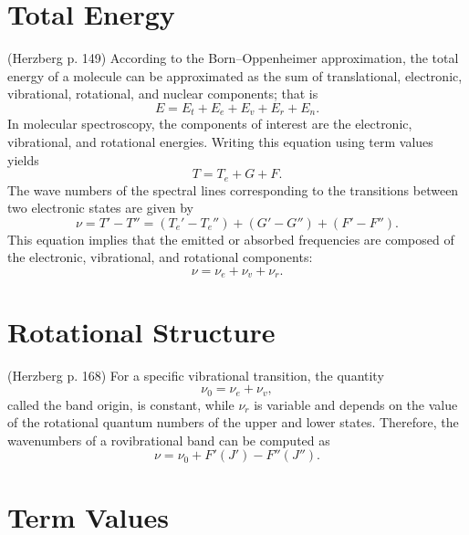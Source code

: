 \documentclass[11pt, twoside, fleqn]{report}
\begin{document}
\section{Total Energy}

 (Herzberg p. 149)
According to the Born--Oppenheimer approximation, the total energy of a molecule can be approximated as the sum of translational, electronic, vibrational, rotational, and nuclear components; that is
\begin{equation*}
    E = E_{t} + E_{e} + E_{v} + E_{r} + E_{n}.
\end{equation*}
In molecular spectroscopy, the components of interest are the electronic, vibrational, and rotational energies. Writing this equation using term values yields
\begin{equation*}
    T = T_{e} + G + F.
\end{equation*}
The wave numbers of the spectral lines corresponding to the transitions between two electronic states are given by
\begin{equation*}
    \nu = T' - T'' = (T_{e}' - T_{e}'') + (G' - G'') + (F' - F'').
\end{equation*}
This equation implies that the emitted or absorbed frequencies are composed of the electronic, vibrational, and rotational components:
\begin{equation*}
    \nu = \nu_{e} + \nu_{v} + \nu_{r}.
\end{equation*}

\section{Rotational Structure}

 (Herzberg p. 168)
For a specific vibrational transition, the quantity
\begin{equation*}
    \nu_{0} = \nu_{e} + \nu_{v},
\end{equation*}
called the band origin, is constant, while $\nu_{r}$ is variable and depends on the value of the rotational quantum numbers of the upper and lower states. Therefore, the wavenumbers of a rovibrational band can be computed as
\begin{equation*}
    \nu = \nu_{0} + F'(J') - F''(J'').
\end{equation*}

\section{Term Values}
\end{document}
